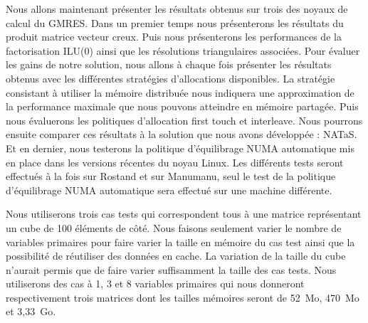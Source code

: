Nous allons maintenant présenter les résultats obtenus sur trois des noyaux de calcul du GMRES.
%
Dans un premier temps nous présenterons les résultats du produit matrice vecteur creux.
%
Puis nous présenterons les performances de la factorisation ILU(0) ainsi que les résolutions triangulaires associées.
%
Pour évaluer les gains de notre solution, nous allons à chaque fois présenter les résultats obtenus avec les différentes stratégies d'allocations disponibles.
%
La stratégie consistant à utiliser la mémoire distribuée nous indiquera une approximation de la performance maximale que nous pouvons atteindre en mémoire partagée.
%
Puis nous évaluerons les politiques d'allocation first touch et interleave.
%
Nous pourrons ensuite comparer ces résultats à la solution que nous avons développée : NATaS.
%
Et en dernier, nous testerons la politique d'équilibrage NUMA automatique mis en place dans les versions récentes du noyau Linux.
%
Les différents tests seront effectués à la fois sur Rostand et sur Manumanu, seul le test de la politique d'équilibrage NUMA automatique sera effectué sur une machine différente.

Nous utiliserons trois cas tests qui correspondent tous à une matrice représentant un cube de 100 éléments de côté.
%
Nous faisons seulement varier le nombre de variables primaires pour faire varier la taille en mémoire du cas test ainsi que la possibilité de réutiliser des données en cache.
%
La variation de la taille du cube n'aurait permis que de faire varier suffisamment la taille des cas tests.
%
Nous utiliserons des cas à 1, 3 et 8 variables primaires qui nous donneront respectivement trois matrices dont les tailles mémoires seront de 52~Mo, 470~Mo et 3,33~Go.
